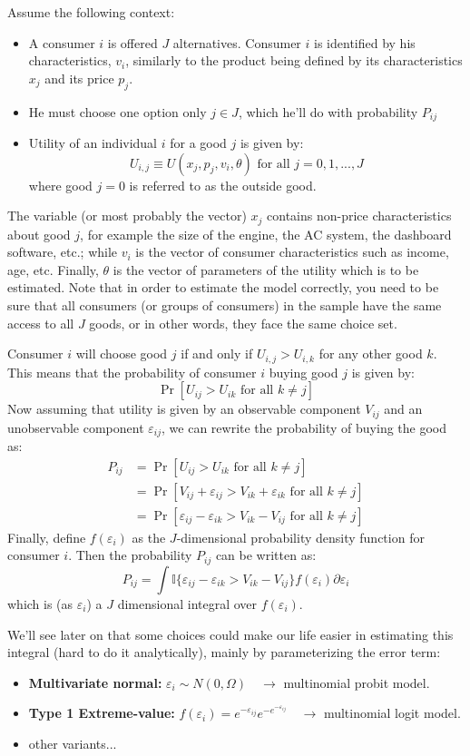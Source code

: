 \documentclass[12pt]{report}
\newcommand{\prob}[1]{\operatorname{Pr}\left[#1\right]}
\begin{document}
Assume the following context:\begin{itemize}
\item A consumer $i$ is offered $J$ alternatives. Consumer $i$ is identified by his characteristics, $v_i$, similarly to the product being defined by its characteristics $x_j$ and its price $p_j$.
\item He must choose one option only $j\in J$, which he'll do with probability $P_{ij}$
\item Utility of an individual $i$ for a good $j$ is given by: $$U_{i,j} \equiv U(x_j, p_j, v_i, \theta) \text{ for all } j = 0, 1, ..., J $$ where good $j =0$ is referred to as the outside good.
\end{itemize}  The variable (or most probably the vector) $x_j$ contains non-price characteristics about good $j$, for example the size of the engine, the AC system, the dashboard software, etc.; while $v_i$ is the vector of consumer characteristics such as income, age, etc. Finally, $\theta$ is the vector of parameters of the utility which is to be estimated. Note that in order to estimate the model correctly, you need to be sure that all consumers (or groups of consumers) in the sample have the same access to all $J$ goods, or in other words, they face the same choice set.

Consumer $i$ will choose good $j$ if and only if $U_{i,j} > U_{i, k}$ for any other good $k$. This means that the probability of consumer $i$ buying good $j$ is given by: $$\prob{U_{ij}>U_{ik}\text{ for all } k\neq j} $$ Now assuming that utility is given by an observable component $V_{ij}$ and an unobservable component $\varepsilon_{ij}$, we can rewrite the probability of buying the good as: \begin{align*} P_{ij} & = \prob{U_{ij}>U_{ik}\text{ for all } k\neq j} \\
& = \prob{V_{ij}+\varepsilon_{ij}>V_{ik}+\varepsilon_{ik}\text{ for all } k\neq j} \\
& = \prob{\varepsilon_{ij} - \varepsilon_{ik} > V_{ik} - V_{ij} \text{ for all } k\neq j}
\end{align*} Finally, define $f(\varepsilon_i)$ as the $J$-dimensional probability density function for consumer $i$. Then the probability $P_{ij}$ can be written as: $$P_{ij} = \int \mathbb{I}\{\varepsilon_{ij} - \varepsilon_{ik} > V_{ik} - V_{ij}\}f(\varepsilon_i)\partial \varepsilon_i $$ which is (as $\varepsilon_i$) a $J$ dimensional integral over $f(\varepsilon_i)$.

We'll see later on that some choices could make our life easier in estimating this integral (hard to do it analytically), mainly by parameterizing the error term:\begin{itemize}
\item \textbf{Multivariate normal:} $\varepsilon_i \sim N(0, \Omega)\quad \to $ multinomial probit model.
\item \textbf{Type 1 Extreme-value:} $f(\varepsilon_i) = e^{-\varepsilon_{ij}} e^{-e^{-\varepsilon_{ij}}} \quad \to $ multinomial logit model.
\item other variants...
\end{itemize}
\end{document}
